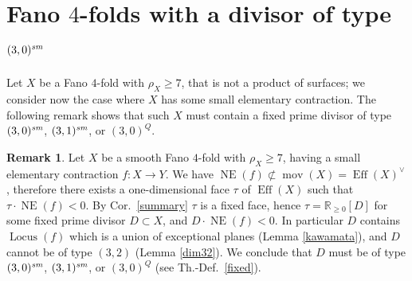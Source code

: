 \documentclass[a4paper,12pt]{amsart}
\theoremstyle{definition}
\newtheorem{remark}[thm]{Remark}
\numberwithin{figure}{section}
\numberwithin{table}{section}
\newcommand{\R}{\mathbb{R}}
\newcommand{\NE}{\operatorname{NE}}
\newcommand{\Lo}{\operatorname{Locus}}
\newcommand{\Eff}{\operatorname{Eff}}
\newcommand{\mov}{\operatorname{mov}}
\newcommand{\sm}{\text{\it sm}}
\begin{document}
\section{Fano $4$-folds with a  divisor of type $(3,0)^{\sm}$}\label{sec30}
\noindent Let $X$ be a Fano $4$-fold with $\rho_X\geq 7$, that is not a product of surfaces; we consider now the case where $X$ has some small elementary contraction.  The following remark shows that such $X$ must contain a fixed prime divisor  of type $(3,0)^{\sm}$, $(3,1)^{\sm}$, or $(3,0)^Q$.
 \begin{remark}\label{united}
Let $X$ be a smooth Fano $4$-fold with $\rho_X\geq 7$, having a small elementary contraction $f\colon X\to Y$. We have $\NE(f)\not\subset\mov(X)=\Eff(X)^{\vee}$, therefore there exists a one-dimensional face $\tau$ of $\Eff(X)$ such that $\tau\cdot\NE(f)<0$. By Cor.~\ref{summary} $\tau$ is a fixed face, hence $\tau=\R_{\geq 0}[D]$ for some  fixed prime divisor $D\subset X$, and $D\cdot\NE(f)<0$. In particular $D$ contains $\Lo(f)$ which is a union of exceptional planes (Lemma \ref{kawamata}), and $D$ cannot be of type $(3,2)$ (Lemma \ref{dim32}). We conclude that $D$ must be of type $(3,0)^{\sm}$, $(3,1)^{\sm}$, or $(3,0)^Q$ (see Th.-Def.~\ref{fixed}).
          \end{remark}
\end{document}
